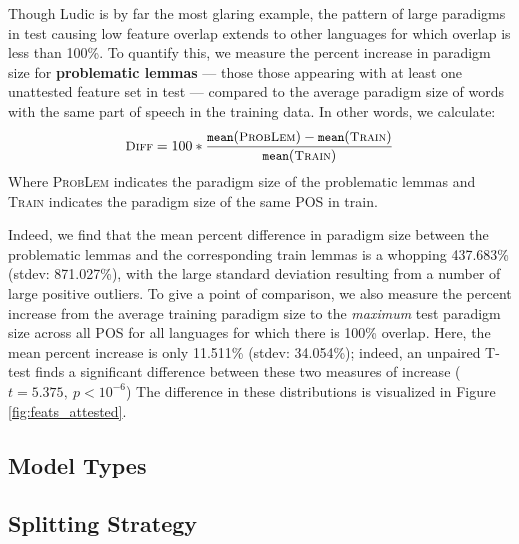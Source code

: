 \documentclass[11pt]{article}
\begin{document}
Though Ludic is by far the most glaring example, the pattern of large paradigms in test causing low feature overlap  extends to other  languages for which overlap is less than 100\%. 
To quantify this, we measure the percent increase in paradigm size for  \textbf{problematic lemmas} --- those  those appearing with at least one unattested feature set in test --- compared to the average paradigm size of words with the same part of speech in the training data.
In other words, we calculate:
\begin{equation}
\begin{small}
\textsc{Diff} = 100* \frac{\texttt{mean}(\textsc{ProbLem}) - \texttt{mean}(\textsc{Train})}{\texttt{mean}(\textsc{Train})}
\end{small}
\end{equation} 
Where \textsc{ProbLem} indicates the paradigm size of the problematic lemmas and \textsc{Train} indicates the paradigm size of the same POS in train. 

Indeed, we find that the mean percent difference in paradigm size between the problematic lemmas and the corresponding train lemmas is a whopping 437.683\% (stdev: 871.027\%), with the large standard deviation resulting from a number of large positive outliers. 
To give a point of comparison, we also measure the percent increase from the average training paradigm size to the \textit{maximum} test paradigm size across all POS for all languages for which there is 100\% overlap. 
Here, the mean percent increase is only 11.511\% (stdev: 34.054\%); indeed, an unpaired T-test finds a significant difference between these two measures of increase ($t = 5.375,~p < 10^{-6}$)
The difference in these distributions is visualized in Figure \ref{fig:feats_attested}.





\subsection{Model Types}
\subsection{Splitting Strategy}












\newpage







%

%
%
\end{document}
